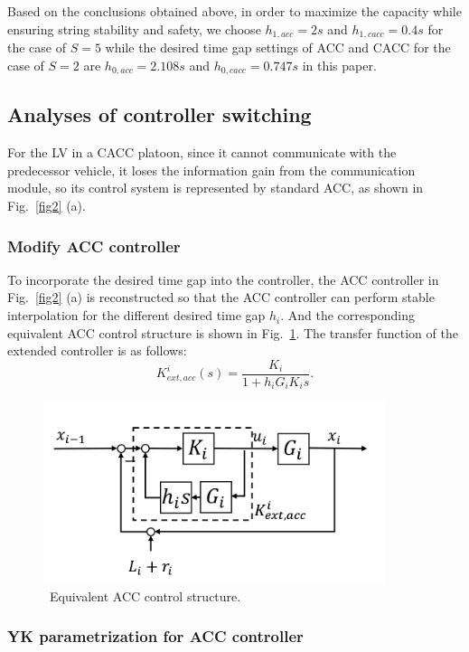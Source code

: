 \documentclass[a4paper,fleqn]{cas-sc}
\begin{document}
Based on the conclusions obtained above, in order to maximize the capacity while ensuring string stability and safety, we choose $h_{1,acc}=2s$ and $h_{1,cacc}=0.4s$ for the case of $S=5$ while the desired time gap settings of ACC and CACC for the case of $S=2$ are $h_{0,acc}=2.108s$ and $h_{0,cacc}=0.747s$ in this paper.

\subsection{Analyses of controller switching}
\label{Section 4.2}

For the LV in a CACC platoon, since it cannot communicate with the predecessor vehicle, it loses the information gain from the communication module, so its control system is represented by standard ACC, as shown in Fig.~\ref{fig2} (a).

\subsubsection{Modify ACC controller}
\label{Section 4.2.1}

To incorporate the desired time gap into the controller, the ACC controller in Fig.~\ref{fig2} (a) is reconstructed so that the ACC controller can perform stable interpolation for the different desired time gap $h_i$. And the corresponding equivalent ACC control structure is shown in Fig.~\ref{fig5}. The transfer function of the extended controller is as follows:
\begin{equation}
  K_{e x t, a c c}^{i}(s)=\frac{K_{i}}{1+h_{i} G_{i} K_{i} s}.
\end{equation}
\begin{figure}
  \centering
  \includegraphics[width=10cm]{figs/fig5.png}
  \caption{~Equivalent ACC control structure.}
  \label{fig5}
\end{figure}

\subsubsection{YK parametrization for ACC controller}
\label{Section 4.2.2}
\end{document}
